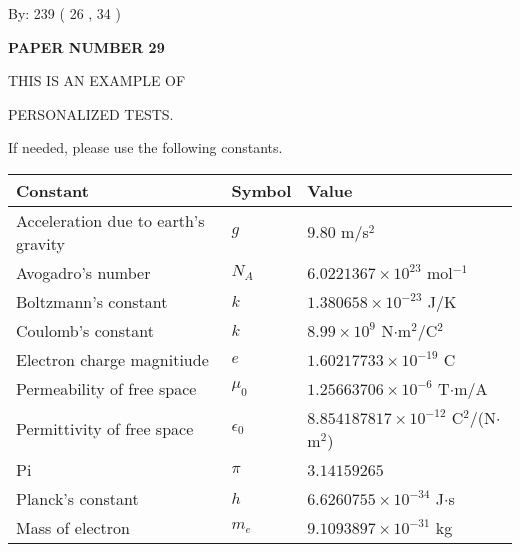 \documentclass[12pt]{article}
\begin{document}
   
\hspace{1.0in} By: 
         239 (          26 ,           34 )
   
   
   
   
\newpage 
\setcounter{page}{ 
    29001 } 
   
   
   
   
 {\textbf{ \Large{ PAPER NUMBER           29  }}}
   
   
\vspace{0.2in}
   
   
   
   
   
   
   
   
 \vspace{0.2in}
 
 
{\Huge  THIS IS AN EXAMPLE OF}
 
{\Huge  PERSONALIZED TESTS. }
 
If needed, please use the following constants.
 
 
 
\noindent\begin{tabular}{|l|l|l|}
\hline
Constant & Symbol & Value \\
\hline
Acceleration due to earth's gravity &
$g$ &
 $ 9.80 $
m/s$^2$ \\
\hline
Avogadro's number &
$N_A$ &
 $ 6.0221367 \times 10^{23} $
mol$^{-1}$ \\
\hline
Boltzmann's constant &
$k$ &
 $ 1.380658 \times 10^{-23} $
J/K \\
\hline
Coulomb's constant &
$k$ &
 $ 8.99 \times 10^{9} $
N$\cdot $m$^2$/C$^2$ \\
\hline
Electron charge magnitiude &
$e$ &
 $ 1.60217733 \times 10^{-19} $
C \\
\hline
Permeability of free space &
$\mu _0$ &
 $ 1.25663706 \times 10^{-6} $
T$\cdot $m/A \\
\hline
Permittivity of free space &
$\epsilon _0$ &
 $ 8.854187817 \times 10^{-12} $
C$^2$/(N$\cdot $m$^2$) \\
\hline
Pi &
$\pi$ &
 $ 3.14159265 $
$ $ \\
\hline
Planck's constant &
$h$ &
 $ 6.6260755 \times 10^{-34} $
J$\cdot $s \\
\hline
Mass of electron &
$m_e$ &
 $ 9.1093897 \times 10^{-31} $
kg \\
\hline
\end{tabular}
 
\end{document}
